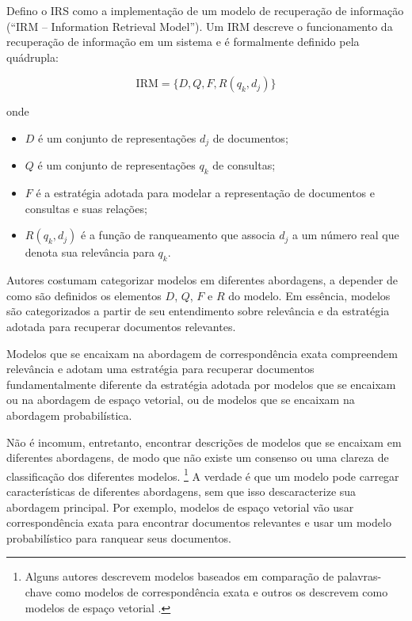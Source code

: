 \documentclass[
	12pt,				%
	openright,			%
	oneside,			%
	a4paper,			%
	english,			%
	french,				%
	spanish,			%
	brazil				%
	]{abntex2}
\begin{document}
Defino o IRS como a implementação de um modelo de recuperação de informação (``IRM -- Information Retrieval Model'').
Um IRM descreve o funcionamento da recuperação de informação em um sistema e é formalmente definido pela quádrupla: \cite{Ceri2013}

\begin{equation}
\text{IRM} = \{D, Q, F, R(q_k, d_j)\}
\label{eq:irm}
\end{equation}

onde
\begin{itemize}
    \item \(D\) é um conjunto de representações \(d_j\) de documentos;
    \item \(Q\) é um conjunto de representações \(q_k\) de consultas;
    \item \(F\) é a estratégia adotada para modelar a representação de documentos e consultas e suas relações;
    \item \(R(q_k, d_j)\) é a função de ranqueamento que associa \(d_j\) a um número real que denota sua relevância para \(q_k\).
\end{itemize}

Autores costumam categorizar modelos em diferentes abordagens, a depender de como são definidos os elementos $D$, $Q$, $F$ e $R$ do modelo.
Em essência, modelos são categorizados a partir de seu entendimento sobre relevância e da estratégia adotada para recuperar documentos relevantes.

Modelos que se encaixam na abordagem de correspondência exata compreendem relevância e adotam uma estratégia para recuperar documentos fundamentalmente diferente da estratégia adotada por modelos que se encaixam ou na abordagem de espaço vetorial, ou de modelos que se encaixam na abordagem probabilística.
\cite{Hiemstra2009}

Não é incomum, entretanto, encontrar descrições de modelos que se encaixam em diferentes abordagens,
de modo que não existe um consenso ou uma clareza de classificação dos diferentes modelos.
\footnote{Alguns autores descrevem modelos baseados em comparação de palavras-chave como modelos de correspondência exata \cite{} e outros os descrevem como modelos de espaço vetorial \cite{Hiemstra2009}.}
A verdade é que um modelo pode carregar características de diferentes abordagens, sem que isso descaracterize sua abordagem principal.
Por exemplo, modelos de espaço vetorial vão usar correspondência exata para encontrar documentos relevantes e usar um modelo probabilístico para ranquear seus documentos.
\end{document}
